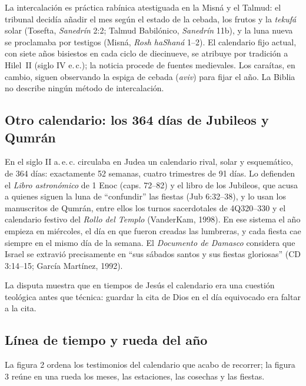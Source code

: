 \documentclass[11pt,letterpaper]{article}
\begin{document}
\begin{nota}[Precisión]
La intercalación es práctica rabínica atestiguada en la Misná y el Talmud: el tribunal decidía añadir el mes según el estado de la cebada, los frutos y la \emph{tekufá} solar (Tosefta, \emph{Sanedrín} 2:2; Talmud Babilónico, \emph{Sanedrín} 11b), y la luna nueva se proclamaba por testigos (Misná, \emph{Rosh haShaná} 1--2). El calendario fijo actual, con siete años bisiestos en cada ciclo de diecinueve, se atribuye por tradición a Hilel~II (siglo IV e.\,c.); la noticia procede de fuentes medievales. Los caraítas, en cambio, siguen observando la espiga de cebada (\emph{aviv}) para fijar el año. La Biblia no describe ningún método de intercalación.
\end{nota}

\subsection{Otro calendario: los 364 días de Jubileos y Qumrán}
En el siglo II a.\,e.\,c. circulaba en Judea un calendario rival, solar y esquemático, de 364 días: exactamente 52 semanas, cuatro trimestres de 91 días. Lo defienden el \emph{Libro astronómico} de 1 Enoc (caps. 72--82) y el libro de los Jubileos, que acusa a quienes siguen la luna de ``confundir'' las fiestas (Jub 6:32--38), y lo usan los manuscritos de Qumrán, entre ellos los turnos sacerdotales de 4Q320--330 y el calendario festivo del \emph{Rollo del Templo} (VanderKam, 1998). En ese sistema el año empieza en miércoles, el día en que fueron creadas las lumbreras, y cada fiesta cae siempre en el mismo día de la semana. El \emph{Documento de Damasco} considera que Israel se extravió precisamente en ``sus sábados santos y sus fiestas gloriosas'' (CD 3:14--15; García Martínez, 1992).

La disputa muestra que en tiempos de Jesús el calendario era una cuestión teológica antes que técnica: guardar la cita de Dios en el día equivocado era faltar a la cita.

\subsection{Línea de tiempo y rueda del año}
La figura 2 ordena los testimonios del calendario que acabo de recorrer; la figura 3 reúne en una rueda los meses, las estaciones, las cosechas y las fiestas.
\end{document}

